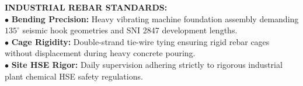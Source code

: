 \documentclass[10pt,a4paper,landscape]{article}
\begin{document}
\begin{minipage}[t]{0.30\linewidth}
  \begin{tcolorbox}[sharp corners, boxrule=0.6pt, colframe=pnavy, colback=pbglight, left=2.5mm, right=2.5mm, top=2mm, bottom=2mm, height=54mm]
    {\fontsize{7pt}{8.5pt}\selectfont\bfseries\color{pnavy}INDUSTRIAL REBAR STANDARDS:}\\[1.5mm]
    {\fontsize{6.5pt}{8.2pt}\selectfont\color{psteel}
    $\bullet$ \textbf{Bending Precision:} Heavy vibrating machine foundation assembly demanding $135^\circ$ seismic hook geometries and SNI 2847 development lengths.\\
    $\bullet$ \textbf{Cage Rigidity:} Double-strand tie-wire tying ensuring rigid rebar cages without displacement during heavy concrete pouring.\\
    $\bullet$ \textbf{Site HSE Rigor:} Daily supervision adhering strictly to rigorous industrial plant chemical HSE safety regulations.
    }
  \end{tcolorbox}
\end{minipage}%
\hfill
\end{document}
